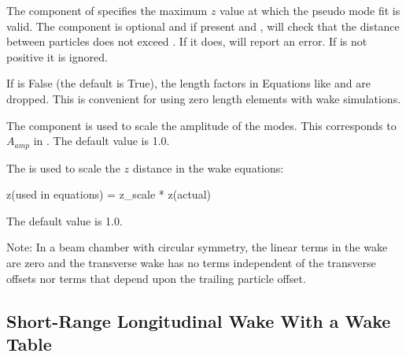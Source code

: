The  component of  specifies the maximum $z$ value at which the pseudo
mode fit is valid. The  component is optional and if present and , \bmad will
check that the distance between particles does not exceed . If it does, \bmad will report
an error. If  is not positive it is ignored.

If  is False (the default is True), the length factors in Equations like
 and  are dropped. This is convenient for using zero length elements with
wake simulations.

The  component is used to scale the amplitude of the modes. This corresponds to $A_{amp}$
in . The default value is 1.0.

The  is used to scale the $z$ distance in the wake equations:
\begin{example}
  z(used in equations) = z_scale * z(actual)
\end{example}
The default value is 1.0.

Note: In a beam chamber with circular symmetry, the linear terms in the  wake are
zero and the transverse wake has no terms independent of the transverse offsets nor terms that
depend upon the trailing particle offset.

\subsection{Short-Range Longitudinal Wake With a Wake Table}
\label{s:sr.wake.z.long}

